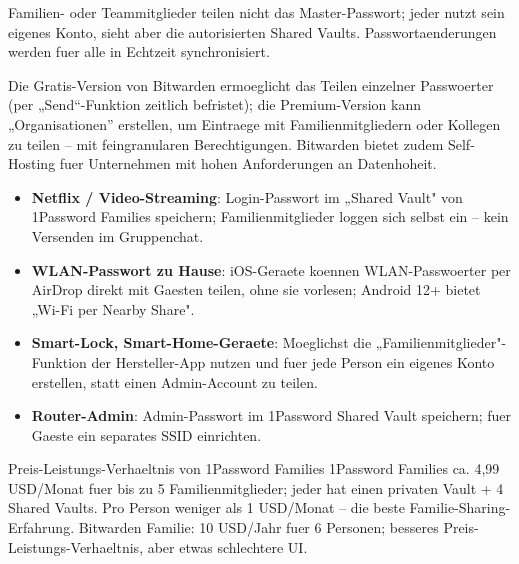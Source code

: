 Familien- oder Teammitglieder teilen nicht das Master-Passwort; jeder nutzt sein eigenes Konto, sieht aber die autorisierten Shared Vaults. Passwortaenderungen werden fuer alle in Echtzeit synchronisiert.


Die Gratis-Version von Bitwarden ermoeglicht das Teilen einzelner Passwoerter (per „Send“-Funktion zeitlich befristet); die Premium-Version kann „Organisationen” erstellen, um Eintraege mit Familienmitgliedern oder Kollegen zu teilen – mit feingranularen Berechtigungen. Bitwarden bietet zudem Self-Hosting fuer Unternehmen mit hohen Anforderungen an Datenhoheit.


\begin{itemize}
  \item \textbf{Netflix / Video-Streaming}: Login-Passwort im „Shared Vault" von 1Password Families speichern; Familienmitglieder loggen sich selbst ein – kein Versenden im Gruppenchat.
  \item \textbf{WLAN-Passwort zu Hause}: iOS-Geraete koennen WLAN-Passwoerter per AirDrop direkt mit Gaesten teilen, ohne sie vorlesen; Android 12+ bietet „Wi-Fi per Nearby Share".
  \item \textbf{Smart-Lock, Smart-Home-Geraete}: Moeglichst die „Familienmitglieder"-Funktion der Hersteller-App nutzen und fuer jede Person ein eigenes Konto erstellen, statt einen Admin-Account zu teilen.
  \item \textbf{Router-Admin}: Admin-Passwort im 1Password Shared Vault speichern; fuer Gaeste ein separates SSID einrichten.
\end{itemize}

\begin{tcbinfo}{Preis-Leistungs-Verhaeltnis von 1Password Families}
1Password Families ca. 4,99 USD/Monat fuer bis zu 5 Familienmitglieder; jeder hat einen privaten Vault + 4 Shared Vaults. Pro Person weniger als 1 USD/Monat – die beste Familie-Sharing-Erfahrung. Bitwarden Familie: 10 USD/Jahr fuer 6 Personen; besseres Preis-Leistungs-Verhaeltnis, aber etwas schlechtere UI.

\end{tcbinfo}


